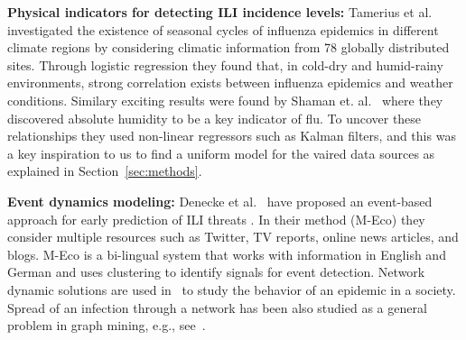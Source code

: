 \textbf{Physical indicators for detecting ILI incidence levels:} 
Tamerius et al.~\cite{ref9} investigated the existence of seasonal 
cycles of influenza epidemics in different climate regions
by considering climatic information from 78 globally distributed sites. Through 
logistic regression they found that, in cold-dry and humid-rainy
environments, strong correlation exists between influenza epidemics and
weather conditions. Similary exciting results were found 
by Shaman et. al.~\cite{Shaman_orig_humidity_link, Shaman_humidity_USA}
where they discovered absolute humidity to be a key indicator of flu. To uncover 
these relationships they used non-linear regressors such as Kalman filters,
and this was a key inspiration to us to find a uniform model for the
vaired data sources as explained in Section~\ref{sec:methods}.

%
\textbf{Event dynamics modeling:}
Denecke et al.~\cite{ref3}
have proposed an event-based approach for early prediction
of ILI threats \cite{ref3}. In their method (M-Eco) they consider
multiple resources such as Twitter, TV reports, online news articles,
and blogs. M-Eco is a bi-lingual system that works with information in
English and German and uses clustering to identify signals for event detection.
Network dynamic solutions are used in~\cite{ref11} 
to study the behavior of an epidemic in a society. Spread of an infection through a network 
has been also studied as a general problem in graph mining, e.g., see~\cite{ref14}.
 
